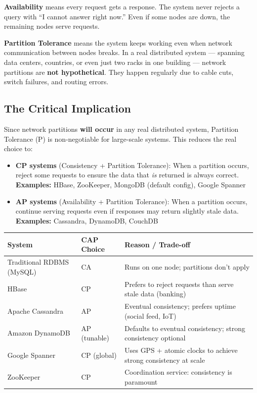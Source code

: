 \documentclass[12pt,a4paper]{article}
\begin{document}
\textbf{Availability} means every request gets a response. The system never rejects a query with ``I cannot answer right now.'' Even if some nodes are down, the remaining nodes serve requests.

\textbf{Partition Tolerance} means the system keeps working even when network communication between nodes breaks. In a real distributed system — spanning data centers, countries, or even just two racks in one building — network partitions are \textbf{not hypothetical}. They happen regularly due to cable cuts, switch failures, and routing errors.

\subsection{The Critical Implication}

Since network partitions \textbf{will occur} in any real distributed system, Partition Tolerance (P) is non-negotiable for large-scale systems. This reduces the real choice to:
\begin{itemize}[leftmargin=2em]
  \item \textbf{CP systems} (Consistency + Partition Tolerance): When a partition occurs, reject some requests to ensure the data that \textit{is} returned is always correct. \textbf{Examples:} HBase, ZooKeeper, MongoDB (default config), Google Spanner
  \item \textbf{AP systems} (Availability + Partition Tolerance): When a partition occurs, continue serving requests even if responses may return slightly stale data. \textbf{Examples:} Cassandra, DynamoDB, CouchDB
\end{itemize}

\begin{center}
\renewcommand{\arraystretch}{1.45}
\begin{tabular}{p{3.8cm}p{2.4cm}p{5.8cm}}
  \toprule
  \textbf{System} & \textbf{CAP Choice} & \textbf{Reason / Trade-off} \\
  \midrule
  Traditional RDBMS (MySQL) & CA & Runs on one node; partitions don't apply \\
  HBase & CP & Prefers to reject requests than serve stale data (banking) \\
  Apache Cassandra & AP & Eventual consistency; prefers uptime (social feed, IoT) \\
  Amazon DynamoDB & AP (tunable) & Defaults to eventual consistency; strong consistency optional \\
  Google Spanner & CP (global) & Uses GPS + atomic clocks to achieve strong consistency at scale \\
  ZooKeeper & CP & Coordination service: consistency is paramount \\
  \bottomrule
\end{tabular}
\end{center}
\end{document}
